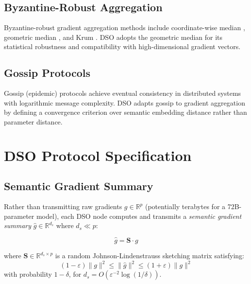 \documentclass[11pt,a4paper]{article}
\begin{document}
\subsection{Byzantine-Robust Aggregation}

Byzantine-robust gradient aggregation methods include coordinate-wise median
\cite{yin2018byzantine}, geometric median \cite{chen2017distributed}, and Krum
\cite{blanchard2017machine}. DSO adopts the geometric median for its statistical
robustness and compatibility with high-dimensional gradient vectors.

\subsection{Gossip Protocols}

Gossip (epidemic) protocols \cite{kermarrec2007gossiping} achieve eventual consistency
in distributed systems with logarithmic message complexity. DSO adapts gossip to
gradient aggregation by defining a convergence criterion over semantic embedding distance
rather than parameter distance.

\section{DSO Protocol Specification}
\label{sec:protocol}

\subsection{Semantic Gradient Summary}

Rather than transmitting raw gradients $g \in \mathbb{R}^p$ (potentially terabytes
for a 72B-parameter model), each DSO node computes and transmits a \emph{semantic
gradient summary} $\hat{g} \in \mathbb{R}^{d_s}$ where $d_s \ll p$:

\begin{equation}
    \hat{g} = \mathbf{S} \cdot g
    \label{eq:sketch}
\end{equation}

where $\mathbf{S} \in \mathbb{R}^{d_s \times p}$ is a random Johnson-Lindenstrauss
sketching matrix satisfying:
\begin{equation}
    (1 - \varepsilon)\|g\|^2 \leq \|\hat{g}\|^2 \leq (1+\varepsilon)\|g\|^2
    \label{eq:jl}
\end{equation}
with probability $1 - \delta$, for $d_s = O(\varepsilon^{-2} \log(1/\delta))$.
\end{document}
